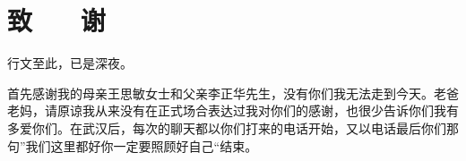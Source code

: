 \section*{致 ~~ 谢}

行文至此，已是深夜。

首先感谢我的母亲王思敏女士和父亲李正华先生，没有你们我无法走到今天。老爸老妈，请原谅我从来没有在正式场合表达过我对你们的感谢，也很少告诉你们我有多爱你们。在武汉后，每次的聊天都以你们打来的电话开始，又以电话最后你们那句”我们这里都好你一定要照顾好自己“结束。                                                                                                                                                                                                                